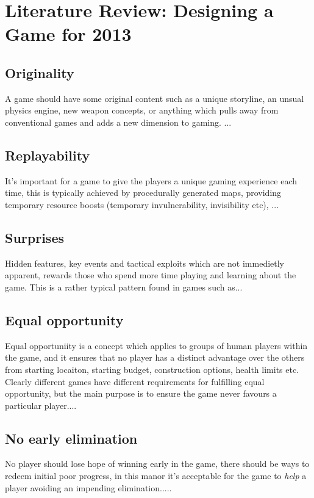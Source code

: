 \section{Literature Review: Designing a Game for 2013}


\subsection*{Originality} A game should have some original content such as a unique storyline, an unsual physics engine, new weapon concepts, or anything which pulls away from conventional games and adds a new dimension to gaming.
...
\subsection*{Replayability} It's important for a game to give the players a unique gaming experience each time, this is typically achieved by procedurally generated maps, providing temporary resource boosts (temporary invulnerability, invisibility etc),
...
\subsection*{Surprises} Hidden features, key events and tactical exploits which are not immedietly apparent, rewards those who spend more time playing and learning about the game. This is a rather typical pattern found in games such as...

\subsection*{Equal opportunity}
Equal opportuniity is a concept which applies to groups of human players within the game, and it ensures that no player has a distinct advantage over the others from starting locaiton, starting budget, construction options, health limits etc. Clearly different games have different requirements for fulfilling equal opportunity, but the main purpose is to ensure the game never favours a particular player....

\subsection*{No early elimination}
No player should lose hope of winning early in the game, there should be ways to redeem initial poor progress, in this manor it's acceptable for the game to \emph{help} a player avoiding an impending elimination.....

